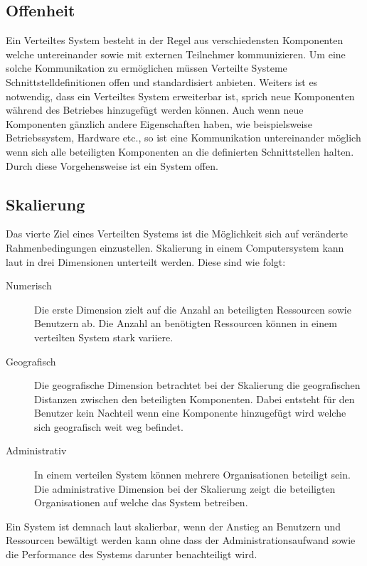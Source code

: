 \subsection{Offenheit}\label{sec:distributedSystems:goales:openness} 
Ein Verteiltes System besteht in der Regel aus verschiedensten Komponenten welche untereinander sowie mit externen Teilnehmer kommunizieren. Um eine solche Kommunikation zu ermöglichen müssen Verteilte Systeme Schnittstelldefinitionen offen und standardisiert anbieten. Weiters ist es notwendig, dass ein Verteiltes System erweiterbar ist, sprich neue Komponenten während des Betriebes hinzugefügt werden können. Auch wenn neue Komponenten gänzlich andere Eigenschaften haben, wie beispielsweise Betriebssystem, Hardware etc., so ist eine Kommunikation untereinander möglich wenn sich alle beteiligten Komponenten an die definierten Schnittstellen halten. Durch diese Vorgehensweise ist ein System offen. 

\subsection{Skalierung}\label{sec:distributedSystems:goales:scalability} 
Das vierte Ziel eines Verteilten Systems ist die Möglichkeit sich auf veränderte Rahmenbedingungen einzustellen. Skalierung in einem Computersystem kann laut \cite{Neuman1993Scale} in drei Dimensionen unterteilt werden. Diese sind wie folgt: 
\begin{description}
  \item[Numerisch] Die erste Dimension zielt auf die Anzahl an beteiligten Ressourcen sowie Benutzern ab. Die Anzahl an benötigten Ressourcen können in einem verteilten System stark variiere.
  \item[Geografisch] Die geografische Dimension betrachtet bei der Skalierung die geografischen Distanzen zwischen den beteiligten Komponenten. Dabei entsteht für den Benutzer kein Nachteil wenn eine Komponente hinzugefügt wird welche sich geografisch weit weg befindet.
  \item[Administrativ] In einem verteilen System können mehrere Organisationen beteiligt sein. Die administrative Dimension bei der Skalierung zeigt die beteiligten Organisationen auf welche das System betreiben.
\end{description}
Ein System ist demnach laut \cite{Neuman1993Scale} skalierbar, wenn der Anstieg an Benutzern und Ressourcen bewältigt werden kann ohne dass der Administrationsaufwand sowie die Performance des Systems darunter benachteiligt wird. \\

